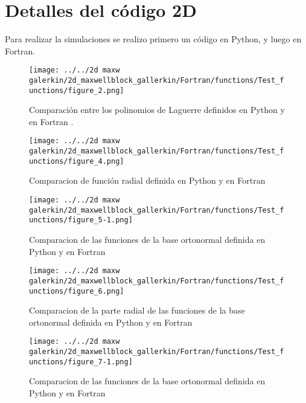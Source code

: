 \section{Detalles del código 2D}

	Para realizar la simulaciones se realizo primero un código en Python, y luego  en Fortran.
	
	\begin{figure}[h]
		\texttt{[image: ../../2d maxw galerkin/2d\_maxwellblock\_gallerkin/Fortran/functions/Test\_functions/figure\_2.png]}
		\caption{Comparación entre los polinomios de Laguerre definidos en Python y en Fortran . }
	\end{figure}
	\begin{figure}[h]
		\texttt{[image: ../../2d maxw galerkin/2d\_maxwellblock\_gallerkin/Fortran/functions/Test\_functions/figure\_4.png]}
		\caption{Comparacion de función radial definida en Python y en Fortran }
	\end{figure}
	\begin{figure}[h]
		\texttt{[image: ../../2d maxw galerkin/2d\_maxwellblock\_gallerkin/Fortran/functions/Test\_functions/figure\_5-1.png]}
		\caption{Comparacion de las funciones de la base ortonormal definida en Python y en Fortran }
	\end{figure}
	\begin{figure}[h]
		\texttt{[image: ../../2d maxw galerkin/2d\_maxwellblock\_gallerkin/Fortran/functions/Test\_functions/figure\_6.png]}
		\caption{Comparacion de la parte radial de las  funciones de la base ortonormal definida en Python y en Fortran }
	\end{figure}
	\begin{figure}[htp]
		\texttt{[image: ../../2d maxw galerkin/2d\_maxwellblock\_gallerkin/Fortran/functions/Test\_functions/figure\_7-1.png]}
		\caption{Comparacion de las funciones de la base ortonormal definida en Python y en Fortran }
	\end{figure}

					
	

